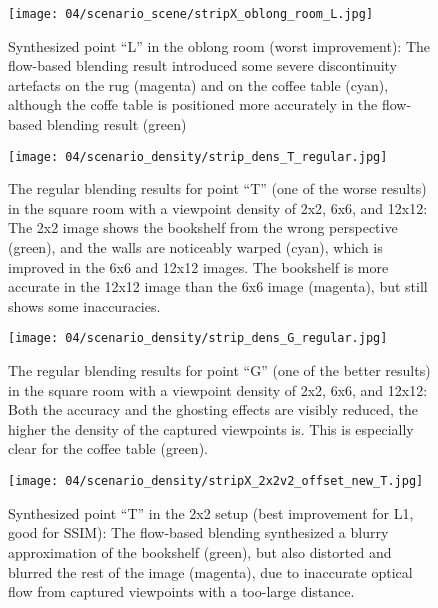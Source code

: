 \begin{figure}
  \centering
  \texttt{[image: 04/scenario\_scene/stripX\_oblong\_room\_L.jpg]}
  \caption[Viewpoint ``L'' in the oblong room]{Synthesized point ``L'' in the oblong room (worst improvement): The flow-based blending result introduced some severe discontinuity artefacts on the rug (magenta) and on the coffee table (cyan), although the coffe table is positioned more accurately in the flow-based blending result (green)}
  \label{fig:scene_oblong_L}
\end{figure}


\begin{figure}
		\centering
    \texttt{[image: 04/scenario\_density/strip\_dens\_T\_regular.jpg]}
		\caption[Regular blending results for viewpoint ``T'' with different densities]{The regular blending results for point ``T'' (one of the worse results) in the square room with a viewpoint density of 2x2, 6x6, and 12x12: The 2x2 image shows the bookshelf from the wrong perspective (green), and the walls are noticeably warped (cyan), which is improved in the 6x6 and 12x12 images. The bookshelf is more accurate in the 12x12 image than the 6x6 image (magenta), but still shows some inaccuracies.}
		\label{fig:density_regular_T}
\end{figure}

\begin{figure}
		\centering
    \texttt{[image: 04/scenario\_density/strip\_dens\_G\_regular.jpg]}
		\caption[Regular blending results for viewpoint ``G'' with different densities] {The regular blending results for point ``G'' (one of the better results) in the square room with a viewpoint density of 2x2, 6x6, and 12x12: Both the accuracy and the ghosting effects are visibly reduced, the higher the density of the captured viewpoints is. This is especially clear for the coffee table (green).}
		\label{fig:density_regular_G}
\end{figure}

\begin{figure}
  \centering
  \texttt{[image: 04/scenario\_density/stripX\_2x2v2\_offset\_new\_T.jpg]}
  \caption[Viewpoint ``T'' in the 2x2 setup]{Synthesized point ``T'' in the 2x2 setup (best improvement for L1, good for SSIM): The flow-based blending synthesized a blurry approximation of the bookshelf (green), but also distorted and blurred the rest of the image (magenta), due to inaccurate optical flow from captured viewpoints with a too-large distance.}
  \label{fig:dens_2x2_T}
\end{figure}

